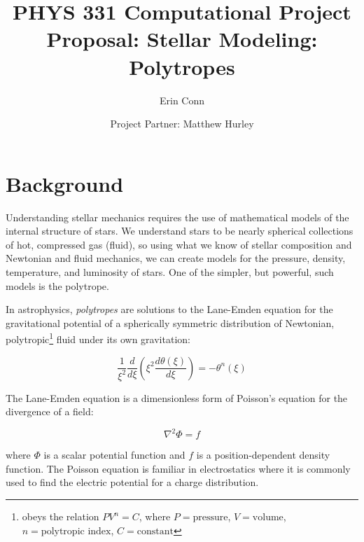 \documentclass{article}
\begin{document}
    \title{PHYS 331 Computational Project Proposal: Stellar Modeling: Polytropes}
        \author{Erin Conn \and Project Partner: Matthew Hurley}
        \date{}
    \maketitle

    \section{Background}

        Understanding stellar mechanics requires the use of mathematical models
        of the internal structure of stars. We understand stars to be nearly
        spherical collections of hot, compressed gas (fluid), so using what we
        know of stellar composition and Newtonian and fluid mechanics, we can
        create models for the pressure, density, temperature, and luminosity of
        stars. One of the simpler, but powerful, such models is the
        polytrope.\cite{hansen2004}

        In astrophysics, \textit{polytropes} are solutions to the Lane-Emden
        equation\cite{lane1870} for the gravitational potential of a spherically
        symmetric distribution of Newtonian, polytropic\footnote{obeys the
        relation \(PV^n=C\), where \(P=\text{pressure}\), \(V=\text{volume}\),
        \(n=\text{polytropic index}\), \(C=\text{constant}\)} fluid under its
        own gravitation\cite{leblanc2010}:

        \begin{equation}
            \label{eq:laneemden}
            \frac{1}{\xi^2}\frac{d}{d\xi}\left(\xi^2\frac{d\theta(\xi)}{d\xi}\right)=-\theta^n(\xi)
        \end{equation}

        The Lane-Emden equation is a dimensionless form of Poisson's equation
        for the divergence of a field:

        \begin{equation}
            \label{eq:genpoisson}
            \nabla^2\Phi = f
        \end{equation}

        where \(\Phi\) is a scalar potential function and \(f\) is a
        position-dependent density function. The Poisson equation is familiar in
        electrostatics\cite{griffiths2013} where it is commonly used to find the
        electric potential for a charge distribution.
\end{document}
